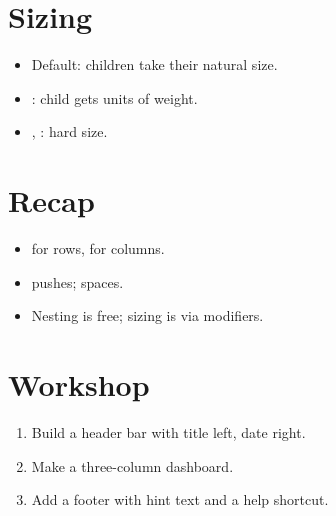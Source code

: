 \section{Sizing}

\begin{itemize}[leftmargin=*]
  \item Default: children take their natural size.
  \item {}: child gets  units of weight.
  \item {}, :
    hard size.
\end{itemize}

\section{Recap}

\begin{recap}
\begin{itemize}[leftmargin=*]
  \item {} for rows,  for columns.
  \item {} pushes;  spaces.
  \item Nesting is free; sizing is via modifiers.
\end{itemize}
\end{recap}

\section*{Workshop}

\begin{enumerate}[leftmargin=*]
  \item Build a header bar with title left, date right.
  \item Make a three-column dashboard.
  \item Add a footer with hint text and a help shortcut.
\end{enumerate}
